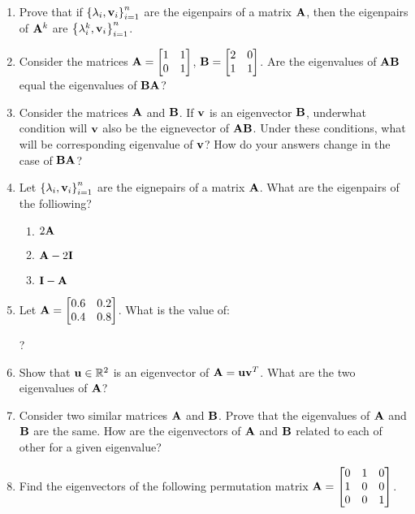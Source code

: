 \documentclass[9pt]{article}
\def\mf{\ensuremath\mathbf}
\def\mb{\ensuremath\mathbb}
\def\lc{\ensuremath\left\{}
\def\rc{\ensuremath\right\}}
\def\bmx{\ensuremath\begin{bmatrix*}[r]}
\def\emx{\ensuremath\end{bmatrix*}}
\begin{document}
\begin{multicols}{2}
\begin{enumerate}[resume]
    \item Prove that if $\lc\lambda_i, \mf{v}_i\rc_{i=1}^n$ are the eigenpairs of a matrix $\mf{A}$, then the eigenpairs of $\mf{A}^k$ are $\lc\lambda_i^k, \mf{v}_i\rc_{i=1}^n$. 

    \item Consider the matrices $\mf{A} = \bmx 1 & 1\\ 0 & 1 \emx$, $\mf{B} = \bmx 2 & 0 \\ 1 & 1\emx$. Are the eigenvalues of $\mf{A}\mf{B}$ equal the eigenvalues of $\mf{B}\mf{A}$?

    \item Consider the matrices $\mf{A}$ and $\mf{B}$. If $\mf{v}$ is an eigenvector $\mf{B}$, underwhat condition will $\mf{v}$ also be the eignevector of $\mf{A}\mf{B}$. Under these conditions, what will be corresponding eigenvalue of $\mf{v}$? How do your answers change in the case of $\mf{BA}$?

    \item Let $\lc \lambda_i, \mf{v}_i\rc_{i=1}^n$ are the eignepairs of a matrix $\mf{A}$. What are the eigenpairs of the folliowing?
    \begin{enumerate}
         \item $2\mf{A}$
         \item $\mf{A} - 2\mf{I}$
         \item $\mf{I} - \mf{A}$
     \end{enumerate}

     \item Let $\mf{A} = \bmx 0.6 & 0.2\\ 0.4 & 0.8\emx$. What is the value of:
     ?

     \item Show that $\mf{u} \in \mb{R}^2$ is an eigenvector of $\mf{A} = \mf{u}\mf{v}^T$. What are the two eigenvalues of $\mf{A}$?

     \item Consider two similar matrices $\mf{A}$ and $\mf{B}$. Prove that the eigenvalues of $\mf{A}$ and $\mf{B}$ are the same. How are the eigenvectors of $\mf{A}$ and $\mf{B}$ related to each of other for a given eigenvalue?

     \item Find the eigenvectors of the following permutation matrix $\mf{A} = \bmx 0 & 1 & 0\\ 1 & 0 & 0 \\ 0 & 0 & 1\emx$.


\end{enumerate}
\end{multicols}
\end{document}
